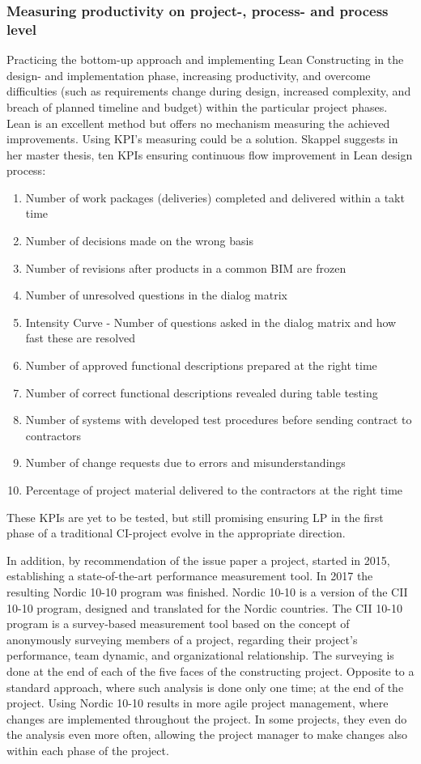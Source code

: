 \subsubsection{Measuring productivity on project-, process- and process level}
Practicing the bottom-up approach and implementing Lean Constructing in the design- and implementation phase, increasing productivity, and overcome difficulties (such as requirements change during design, increased complexity, and breach of planned timeline and budget) within the particular project phases. Lean is an excellent method but offers no mechanism measuring the achieved improvements. Using KPI's measuring could be a solution. Skappel \cite{KPIs_in_lean} suggests in her master thesis, ten KPIs ensuring continuous flow improvement in Lean design process: 
\begin{enumerate}
    \item Number of work packages (deliveries) completed and delivered within a takt time
    \item  Number of decisions made on the wrong basis
    \item  Number of revisions after products in a common BIM are frozen
    \item  Number of unresolved questions in the dialog matrix
    \item  Intensity Curve - Number of questions asked in the dialog matrix and how fast these are
    resolved
    \item  Number of approved functional descriptions prepared at the right time
    \item  Number of correct functional descriptions revealed during table testing
    \item  Number of systems with developed test procedures before sending contract to contractors
    \item  Number of change requests due to errors and misunderstandings
    \item  Percentage of project material delivered to the contractors at the right time
\end{enumerate}
These KPIs are yet to be tested, but still promising ensuring LP in the first phase of a traditional CI-project evolve in the appropriate direction. 

In addition, by recommendation of the issue paper a project, started in 2015, establishing a state-of-the-art performance measurement tool. In 2017 the resulting Nordic 10-10 \cite{nordic-10-10} program was finished. Nordic 10-10 is a version of the CII 10-10 program\cite{CII-10-10}, designed and translated for the Nordic countries. The CII 10-10 program is a survey-based measurement tool based on the concept of anonymously surveying members of a project, regarding their project's performance, team dynamic, and organizational relationship. The surveying is done at the end of each of the five faces of the constructing project. Opposite to a standard approach, where such analysis is done only one time; at the end of the project. Using Nordic 10-10 results in more agile project management, where changes are implemented throughout the project. In some projects, they even do the analysis even more often, allowing the project manager to make changes also within each phase of the project. 

